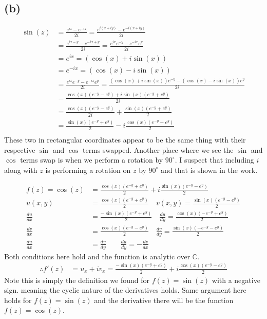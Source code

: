 \documentclass{article}
\newcommand{\der}[2]{\frac{d#1}{d#2}}
\begin{document}
\subsection*{(b)}
\begin{align*}
  \sin{(z)} &= \frac{e^{iz} - e^{-iz}}{2i}  = \frac{e^{i(x+iy)} - e^{-i(x+iy)}}{2i} \\
          &= \frac{e^{ix-y} - e^{-ix+y}}{2i} = \frac{e^{ix}e^{-y} - e^{-ix}e^{y}}{2i} \\
          &= e^{ix} = (\cos{(x)} + i\sin{(x)}) \\
          &= e^{-ix} = (\cos{(x)} - i\sin{(x)}) \\
          &= \frac{e^{ix}e^{-y} - e^{-ix}e^{y}}{2i} = \frac{(\cos{(x)} + i\sin{(x)})e^{-y} - (\cos{(x)} - i\sin{(x)})e^{y}}{2i} \\
  &= \frac{\cos{(x)}(e^{-y} - e^{y}) + i\sin{(x)}(e^{-y}+ e^{y})}{2i} \\
            &= \frac{\cos{(x)}(e^{-y} - e^{y})}{2i} + \frac{\sin{(x)}(e^{-y}+ e^{y})}{2} \\
  &=  \frac{\sin{(x)}(e^{-y}+ e^{y})}{2} -i\frac{\cos{(x)}(e^{-y} - e^{y})}{2} \\
\end{align*}
These two in rectangular coordinates appear to be the same thing with their respective $\sin$ and $\cos$ terms swapped. Another place where we see the $\sin$ and $\cos$ terms swap is when we perform a rotation by $90^\circ$. I suspect that including $i$ along with $z$ is performing a rotation on $z$ by $90^\circ$ and that is shown in the work.

\begin{align*}
  f(z) = \cos{(z)} &= \frac{\cos{(x)}(e^{-y} + e^{y})}{2} + i\frac{\sin{(x)}(e^{-y}- e^{y})}{2}\\
  u(x,y) &= \frac{\cos{(x)}(e^{-y} + e^{y})}{2} \quad v(x,y) = \frac{\sin{(x)}(e^{-y}- e^{y})}{2}\\
  \der{u}{x} &= \frac{-\sin{(x)}(e^{-y} + e^{y})}{2} \quad \der{u}{y}= \frac{\cos{(x)}(-e^{-y} + e^{y})}{2} \\
  \der{v}{x} &= \frac{\cos{(x)}(e^{-y}- e^{y})}{2} \quad \der{v}{y} = \frac{\sin{(x)}(-e^{-y}- e^{y})}{2} \\
  \der{u}{x} &= \der{v}{y} \quad \quad \der{u}{y} = -\der{v}{x}
\end{align*}
Both conditions here hold and the function is analytic over $\mathbb{C}$.
\begin{align*}
  \therefore f'(z) &= u_x + iv_x =  \frac{-\sin{(x)}(e^{-y} + e^{y})}{2} + i\frac{\cos{(x)}(e^{-y}- e^{y})}{2}
\end{align*}
Note this is simply the definition we found for $f(z) = \sin{(z)}$ with a negative sign. meaning the cyclic nature of the derivatives holds. Same argument here holds for  $f(z) = \sin{(z)}$ and the derivative there will be the function $f(z) = \cos{(z)}$.
\end{document}
